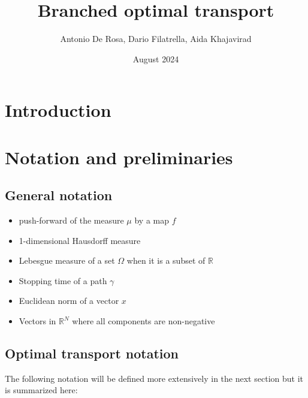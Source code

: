 \documentclass[11pt,reqno,a4paper]{amsart}
\title{Branched optimal transport}
\date{August 2024}
\newenvironment{itemizeb}
{\begin{itemize}
     \itemsep=2pt}{
\end{itemize}}
\numberwithin{equation}{section}
\theoremstyle{mytheorem}
\theoremstyle{myremark}
\theoremstyle{myparagraph}
\newcommand{\R}{\mathbb{R}}
\begin{document}
    \author{Antonio De Rosa, Dario Filatrella, Aida Khajavirad}

    \maketitle



    \tableofcontents
    \newpage

    \nocite{*}


    \section{Introduction}


    \section{Notation and preliminaries}

    \subsection{General notation}

    \begin{itemizeb}
         cm=.3 cm
        \item[$f_{\#}\mu$] push-forward of the measure $\mu$ by a map $f$
        \item[$\mathcal{H}^1$] 1-dimensional Hausdorff measure
        \item[$|\Omega|$] Lebesgue measure of a set $\Omega$ when it is a subset of $\R$
        \item[$T(\gamma)$] Stopping time of a path $\gamma$
        \item[$\|x\|$] Euclidean norm of a vector $x$
        \item[$\R_+^N$] Vectors in $\R^N$ where all components are non-negative
    \end{itemizeb}

    \subsection{Optimal transport notation}
    The following notation will be defined more extensively in the next section but it is summarized here:
\end{document}
